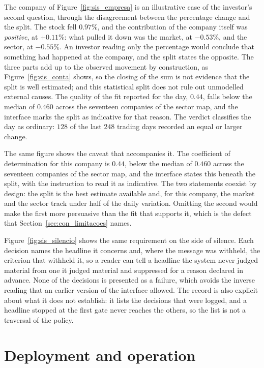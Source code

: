 The company of Figure~\ref{fig:sis_empresa} is an illustrative case of the investor's second
question, through the disagreement between the percentage change and the split. The stock fell
$0.97\%$, and the contribution of the company itself was \emph{positive}, at $+0.11\%$: what pulled
it down was the market, at $-0.53\%$, and the sector, at $-0.55\%$. An investor reading only the
percentage would conclude that something had happened at the company, and the split states the
opposite. The three parts add up to the observed movement by construction, as
Figure~\ref{fig:sis_conta} shows, so the closing of the sum is not evidence that the split is well
estimated; and this statistical split does not rule out unmodelled external causes. The quality of
the fit reported for the day, $0.44$, falls below the median of $0.460$ across the seventeen
companies of the sector map, and the interface marks the split as indicative for that reason. The
verdict classifies the day as ordinary: $128$ of the last $248$ trading days recorded an equal or
larger change.


The same figure shows the caveat that accompanies it. The coefficient of determination for this
company is $0.44$, below the median of $0.460$ across the seventeen companies of the sector map,
and the interface states this beneath the split, with the instruction to read it as indicative. The
two statements coexist by design: the split is the best estimate available and, for this company,
the market and the sector track under half of the daily variation. Omitting the second would make
the first more persuasive than the fit that supports it, which is the defect that
Section~\ref{sec:con_limitacoes} names.

Figure~\ref{fig:sis_silencio} shows the same requirement on the side of silence. Each decision
names the headline it concerns and, where the message was withheld, the criterion that withheld it,
so a reader can tell a headline the system never judged material from one it judged material and
suppressed for a reason declared in advance. None of the decisions is presented as a failure, which
avoids the inverse reading that an earlier version of the interface allowed. The record is also
explicit about what it does not establish: it lists the decisions that were logged, and a headline
stopped at the first gate never reaches the others, so the list is not a traversal of the policy.

\section{Deployment and operation}
\label{sec:sis_operacao}

